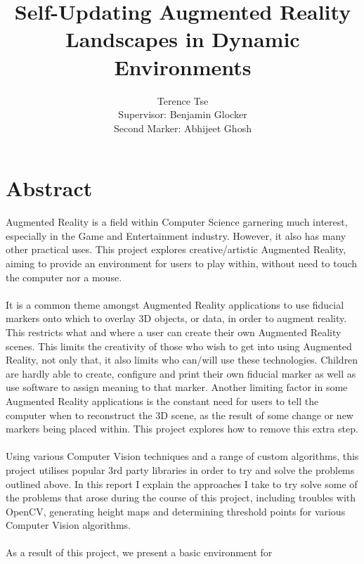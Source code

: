 \documentclass[11pt]{article}
\begin{document}
\title{Self-Updating Augmented Reality Landscapes in Dynamic Environments}
\author{Terence Tse \\
		Supervisor: Benjamin Glocker\\
		Second Marker: Abhijeet Ghosh}
\maketitle

\newpage
\section*{Abstract}
Augmented Reality is a field within Computer Science garnering much 
interest, especially in the Game and Entertainment industry. However, 
it also has many other practical uses. This project explores 
creative/artistic Augmented Reality, aiming to provide an 
environment for users to play within, without need to touch the computer
nor a mouse.\\
\\
It is a common theme amongst Augmented Reality applications to use 
fiducial markers onto which to overlay 3D objects, or data, in 
order to augment reality. This restricts 
what and where a user can create their own Augmented Reality scenes. 
This limits the creativity of those who wish to get into using 
Augmented Reality, not only that, it also limits who can/will 
use these technologies. Children are hardly able to create,
configure and print their own fiducial marker as well as use software to assign
meaning to that marker. Another limiting factor in some 
Augmented Reality applications is the constant need for users to tell 
the computer when to reconstruct the 3D scene, as the result of some 
change or new markers being placed within. This project explores how 
to remove this extra step.\\
\\
Using various Computer Vision techniques and a range of custom 
algorithms, this project utilises popular 3rd party libraries
in order to try and solve the problems outlined above. In this 
report I explain the approaches I take to try solve some of 
the problems that arose during the course of this project, 
including troubles with OpenCV, generating height maps and
determining threshold points for various Computer Vision algorithms.\\
\\
As a result of this project, we present a basic environment for 
\end{document}
